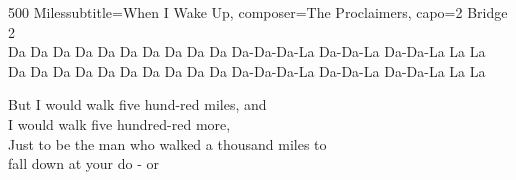 \begin{song}{500 Miles}{subtitle={When I Wake Up}, composer={The Proclaimers}, capo={2}}
Bridge 2 \\
Da Da Da Da          Da Da Da Da      Da Da Da-Da-Da-La Da-Da-La Da-Da-La La La \\

Da Da Da Da           Da Da Da Da      Da Da Da-Da-Da-La Da-Da-La Da-Da-La La La \\

\begin{songChorus}
But I would walk five hund-red miles, and \\
I would walk five hundred-red  more, \\
Just to be the man who walked a thousand  miles to \\
fall down  at  your  do  -  or  \\
\end{songChorus}
\end{song}

